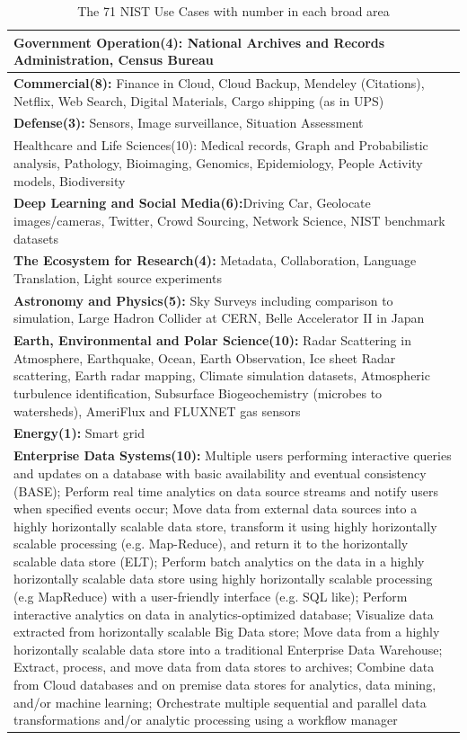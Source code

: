 \documentclass{acm_proc_article-sp}
\begin{document}
\begin{table}
\centering
\caption{The 71 NIST Use Cases with number in each broad area}
\label{Table12}
\begin{tabular}{|p{8cm}|} \hline


\textbf{Government Operation(4):} National Archives and Records Administration, Census Bureau \\ \hline
\textbf{Commercial(8):} Finance in Cloud, Cloud Backup, Mendeley (Citations), Netflix, Web Search, Digital Materials, Cargo shipping (as in UPS) \\ \hline
\textbf{Defense(3):} Sensors, Image surveillance, Situation Assessment \\ \hline
Healthcare and Life Sciences(10): Medical records, Graph and Probabilistic analysis, Pathology, Bioimaging, Genomics, Epidemiology, People Activity models, Biodiversity \\ \hline
\textbf{Deep Learning and Social Media(6):}Driving Car, Geolocate images/cameras, Twitter, Crowd Sourcing, Network Science, NIST benchmark datasets \\ \hline
\textbf{The Ecosystem for Research(4):} Metadata, Collaboration, Language Translation, Light source experiments \\ \hline
\textbf{Astronomy and Physics(5):} Sky Surveys including comparison to simulation, Large Hadron Collider at CERN, Belle Accelerator II in Japan \\ \hline
\textbf{Earth, Environmental and Polar Science(10):} Radar Scattering in Atmosphere, Earthquake, Ocean, Earth Observation, Ice sheet Radar scattering, Earth radar mapping, Climate simulation datasets, Atmospheric turbulence identification, Subsurface Biogeochemistry (microbes to watersheds), AmeriFlux and FLUXNET gas sensors \\ \hline
\textbf{Energy(1):} Smart grid \\ \hline
\textbf{Enterprise Data Systems(10):} Multiple users performing interactive queries and updates on a database with basic availability and eventual consistency (BASE); Perform real time analytics on data source streams and notify users when specified events occur; Move data from external data sources into a highly horizontally scalable data store, transform it using highly horizontally scalable processing (e.g. Map-Reduce), and return it to the horizontally scalable data store (ELT); Perform batch analytics on the data in a highly horizontally scalable data store using highly horizontally scalable processing (e.g MapReduce) with a user-friendly interface (e.g. SQL like); Perform interactive analytics on data in analytics-optimized database; Visualize data extracted from horizontally scalable Big Data store; Move data from a highly horizontally scalable data store into a traditional Enterprise Data Warehouse; Extract, process, and move data from data stores to archives; Combine data from Cloud databases and on premise data stores for analytics, data mining, and/or machine learning; Orchestrate multiple sequential and parallel data transformations and/or analytic processing using a workflow manager \\ \hline


\end{tabular}
\end{table}
\end{document}
